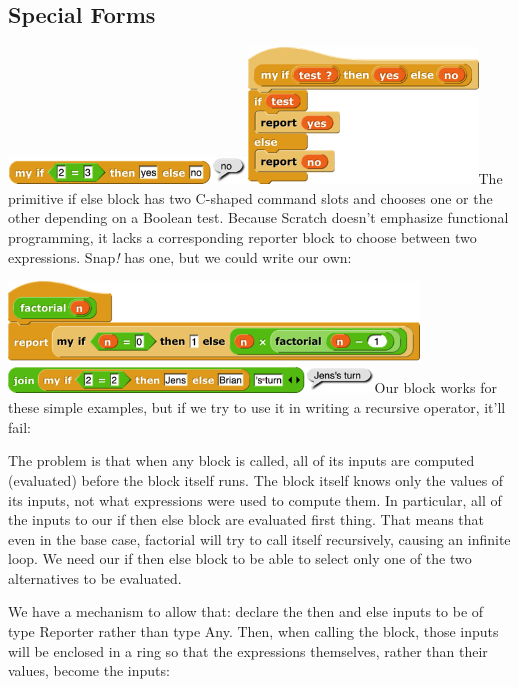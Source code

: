 \subsection{Special Forms}\label{special-forms}

\includegraphics[width=2.49931in,height=0.27847in]{media/image736.png}\includegraphics[width=2.40208in,height=1.42708in]{media/image737.png}The
primitive if else block has two C-shaped command slots and chooses one
or the other depending on a Boolean test. Because Scratch doesn't
emphasize functional programming, it lacks a corresponding reporter
block to choose between two expressions. Snap\emph{!} has one, but we
could write our own:

\includegraphics[width=4.29167in,height=0.84861in]{media/image738.png}\includegraphics[width=3.81899in,height=0.27433in]{media/image739.png}Our
block works for these simple examples, but if we try to use it in
writing a recursive operator, it'll fail:

The problem is that when any block is called, all of its inputs are
computed (evaluated) before the block itself runs. The block itself
knows only the values of its inputs, not what expressions were used to
compute them. In particular, all of the inputs to our if then else block
are evaluated ﬁrst thing. That means that even in the base case,
factorial will try to call itself recursively, causing an infinite loop.
We need our if then else block to be able to select only one of the two
alternatives to be evaluated.

We have a mechanism to allow that: declare the then and else inputs to
be of type Reporter rather than type Any. Then, when calling the block,
those inputs will be enclosed in a ring so that the expressions
themselves, rather than their values, become the inputs:

